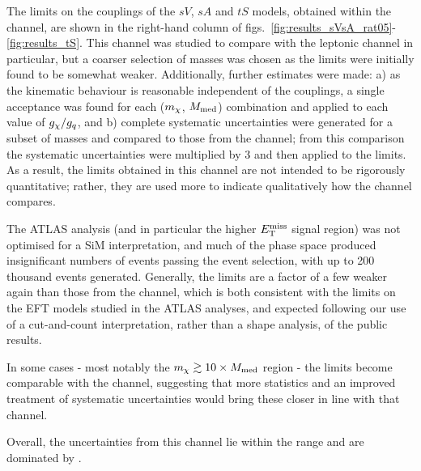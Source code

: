 The limits on the couplings of the $sV$, $sA$ and $tS$ models, obtained within the \monoWZ channel, are shown in the right-hand column of figs.~\ref{fig:results_sVsA_rat05}-\ref{fig:results_tS}. This channel was studied to compare with the leptonic \monoZ channel in particular, but a coarser selection of masses was chosen as the limits were initially found to be somewhat weaker. Additionally, further estimates were made: a) as the kinematic behaviour is reasonable independent of the couplings, a single acceptance was found for each ($m_{\chi}$, $M_{\mathrm{med}}$) combination and applied to each value of $g_{\chi} / g_q$, and b) complete systematic uncertainties were generated for a subset of masses and compared to those from the \monoZ channel; from this comparison the \monoZ systematic uncertainties were multiplied by 3 and then applied to the \monoWZ limits. As a result, the limits obtained in this channel are not intended to be rigorously quantitative; rather, they are used more to indicate qualitatively how the channel compares.

The ATLAS \monoWZ analysis (and in particular the higher $E_{\mathrm{T}}^{\mathrm{miss}}$ signal region) was not optimised for a SiM interpretation, and much of the phase space produced insignificant numbers of events passing the event selection, with up to 200 thousand events generated. Generally, the limits are a factor of a few weaker again than those from the \monoZ channel, which is both consistent with the limits on the EFT models studied in the ATLAS analyses, and expected following our use of a cut-and-count interpretation, rather than a shape analysis, of the \monoWZ public results.

In some cases - most notably the $m_{\chi} \gtrsim 10 \times M_{\mathrm{med}}$ region - the limits become comparable with the \monoZ channel, suggesting that more statistics and an improved treatment of systematic uncertainties would bring these closer in line with that channel.

Overall, the uncertainties from this channel lie within the range  and are dominated by .

\afterpage{\clearpage}


